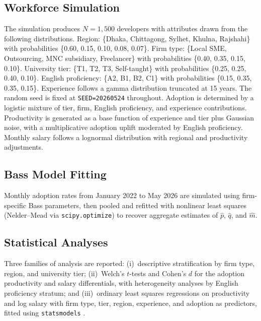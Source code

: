 \documentclass[11pt,a4paper]{article}
\begin{document}
\subsection{Workforce Simulation}

The simulation produces $N=1{,}500$ developers with attributes drawn
from the following distributions. Region: \{Dhaka, Chittagong, Sylhet,
Khulna, Rajshahi\} with probabilities \{0.60, 0.15, 0.10, 0.08, 0.07\}.
Firm type: \{Local SME, Outsourcing, MNC subsidiary, Freelancer\} with
probabilities \{0.40, 0.35, 0.15, 0.10\}. University tier: \{T1, T2,
T3, Self-taught\} with probabilities \{0.25, 0.25, 0.40, 0.10\}.
English proficiency: \{A2, B1, B2, C1\} with probabilities \{0.15,
0.35, 0.35, 0.15\}. Experience follows a gamma distribution truncated
at 15 years. The random seed is fixed at \texttt{SEED=20260524}
throughout. Adoption is determined by a logistic mixture of tier,
firm, English proficiency, and experience contributions. Productivity
is generated as a base function of experience and tier plus Gaussian
noise, with a multiplicative adoption uplift moderated by English
proficiency. Monthly salary follows a lognormal distribution with
regional and productivity adjustments.

\subsection{Bass Model Fitting}

\begin{sloppypar}
Monthly adoption rates from January 2022 to May 2026 are simulated
using firm-specific Bass parameters, then pooled and refitted with
nonlinear least squares (Nelder--Mead via \texttt{scipy.optimize}) to
recover aggregate estimates of $\hat{p}$, $\hat{q}$, and $\hat{m}$.
\end{sloppypar}

\subsection{Statistical Analyses}

Three families of analysis are reported: (i)~descriptive
stratification by firm type, region, and university tier; (ii)~Welch's
$t$-tests and Cohen's $d$ \citep{Cohen1988,HedgesOlkin1985} for the
adoption productivity and salary differentials, with heterogeneity
analyses by English proficiency stratum; and (iii)~ordinary least
squares regressions on productivity and log salary with firm type,
tier, region, experience, and adoption as predictors, fitted using
\texttt{statsmodels} \citep{Seabold2010Statsmodels}.
\end{document}
